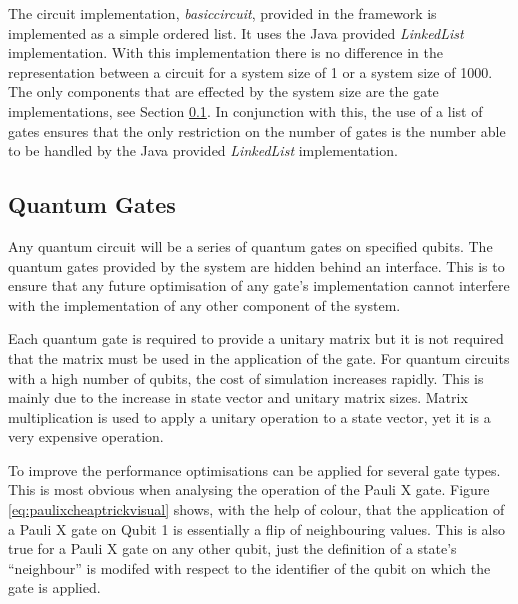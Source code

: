 The circuit implementation, \emph{basiccircuit}, provided in the framework is implemented as a simple ordered list.
It uses the Java provided \emph{LinkedList} implementation.
With this implementation there is no difference in the representation between a circuit for a system size of 1 or a system size of 1000.
The only components that are effected by the system size are the gate implementations, see Section \ref{sec:quantumgates}.
In conjunction with this, the use of a list of gates ensures that the only restriction on the number of gates is the number able to be handled by the Java provided \emph{LinkedList} implementation.

\subsection{Quantum Gates}
\label{sec:quantumgates}
Any quantum circuit will be a series of quantum gates on specified qubits.
The quantum gates provided by the system are hidden behind an interface.
This is to ensure that any future optimisation of any gate's implementation cannot interfere with the implementation of any other component of the system.

Each quantum gate is required to provide a unitary matrix but it is not required that the matrix must be used in the application of the gate.
For quantum circuits with a high number of qubits, the cost of simulation increases rapidly.
This is mainly due to the increase in state vector and unitary matrix sizes.
Matrix multiplication is used to apply a unitary operation to a state vector, yet it is a very expensive operation.

To improve the performance optimisations can be applied for several gate types.
This is most obvious when analysing the operation of the Pauli X gate.
Figure \ref{eq:paulixcheaptrickvisual} shows, with the help of colour, that the application of a Pauli X gate on Qubit 1 is essentially a flip of neighbouring values.
This is also true for a Pauli X gate on any other qubit, just the definition of a state's ``neighbour'' is modifed with respect to the identifier of the qubit on which the gate is applied.

